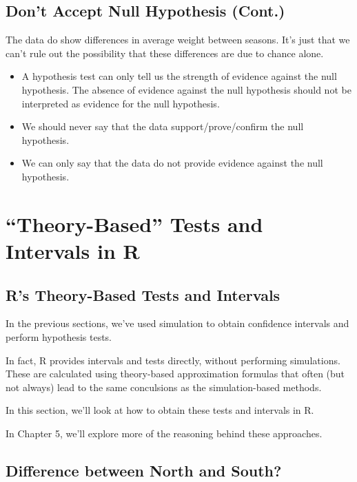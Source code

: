 \documentclass[]{book}
\begin{document}
\subsection{Don't Accept Null Hypothesis
(Cont.)}\label{dont-accept-null-hypothesis-cont.}

The data do show differences in average weight between seasons. It's
just that we can't rule out the possibility that these differences are
due to chance alone.

\begin{itemize}
\item
  A hypothesis test can only tell us the strength of evidence against
  the null hypothesis. The absence of evidence against the null
  hypothesis should not be interpreted as evidence for the null
  hypothesis.
\item
  We should never say that the data support/prove/confirm the null
  hypothesis.
\item
  We can only say that the data do not provide evidence against the null
  hypothesis.
\end{itemize}

\section{\texorpdfstring{``Theory-Based'' Tests and Intervals in
R}{Theory-Based Tests and Intervals in R}}\label{theory-based-tests-and-intervals-in-r}

\subsection{R's Theory-Based Tests and
Intervals}\label{rs-theory-based-tests-and-intervals}

In the previous sections, we've used simulation to obtain confidence
intervals and perform hypothesis tests.

In fact, R provides intervals and tests directly, without performing
simulations. These are calculated using theory-based approximation
formulas that often (but not always) lead to the same conculsions as the
simulation-based methods.

In this section, we'll look at how to obtain these tests and intervals
in R.

In Chapter 5, we'll explore more of the reasoning behind these
approaches.

\subsection{Difference between North and
South?}\label{difference-between-north-and-south}
\end{document}
